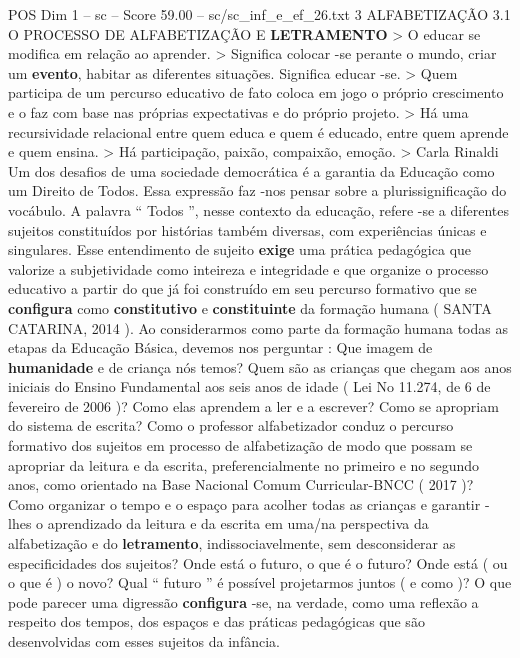 \begin{textsample}{POS Dim 1 – sc – Score 59.00 – sc/sc\_inf\_e\_ef\_26.txt}  \label{ex:f1_pos_018}
3 ALFABETIZAÇÃO 3.1 O PROCESSO DE ALFABETIZAÇÃO E \textbf{LETRAMENTO} > O educar se modifica em relação ao aprender. > Significa colocar -se perante o mundo, criar um \textbf{evento}, habitar as diferentes situações.
Significa educar -se. > Quem participa de um percurso educativo de fato coloca em jogo o próprio crescimento e o faz com base nas próprias expectativas e do próprio projeto. > Há uma recursividade relacional entre quem educa e quem é educado, entre quem aprende e quem ensina. > Há participação, paixão, compaixão, emoção. > Carla Rinaldi Um dos desafios de uma sociedade democrática é a garantia da Educação como um Direito de Todos.
Essa expressão faz -nos pensar sobre a plurissignificação do vocábulo.
A palavra “ Todos ”, nesse contexto da educação, refere -se a diferentes sujeitos constituídos por histórias também diversas, com experiências únicas e singulares.
Esse entendimento de sujeito \textbf{exige} uma prática pedagógica que valorize a subjetividade como inteireza e integridade e que organize o processo educativo a partir do que já foi construído em seu percurso formativo que se \textbf{configura} como \textbf{constitutivo} e \textbf{constituinte} da formação humana ( SANTA CATARINA, 2014 ).
Ao considerarmos como parte da formação humana todas as etapas da Educação Básica, devemos nos perguntar : Que imagem de \textbf{humanidade} e de criança nós temos?
Quem são as crianças que chegam aos anos iniciais do Ensino Fundamental aos seis anos de idade ( Lei No 11.274, de 6 de fevereiro de 2006 )?
Como elas aprendem a ler e a escrever?
Como se apropriam do sistema de escrita?
Como o professor alfabetizador conduz o percurso formativo dos sujeitos em processo de alfabetização de modo que possam se apropriar da leitura e da escrita, preferencialmente no primeiro e no segundo anos, como orientado na Base Nacional Comum Curricular-BNCC ( 2017 )?
Como organizar o tempo e o espaço para acolher todas as crianças e garantir -lhes o aprendizado da leitura e da escrita em uma/na perspectiva da alfabetização e do \textbf{letramento}, indissociavelmente, sem desconsiderar as especificidades dos sujeitos?
Onde está o futuro, o que é o futuro?
Onde está ( ou o que é ) o novo?
Qual “ futuro ” é possível projetarmos juntos ( e como )?
O que pode parecer uma digressão \textbf{configura} -se, na verdade, como uma reflexão a respeito dos tempos, dos espaços e das práticas pedagógicas que são desenvolvidas com esses sujeitos da infância.

\end{textsample}

